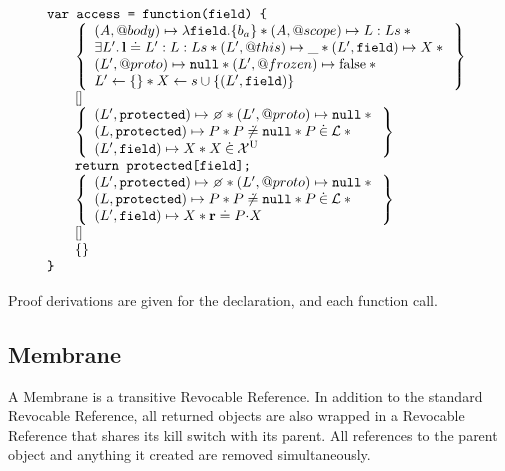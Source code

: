 \documentclass[a4paper]{article}
\begin{document}
\[
  \begin{array}{l}
    \js{var access = function(field) \{} \\
    \begin{array}{@{\qquad}l}
      \logic{
        (A, @body) \mapsto \lambda \js{field}.\{b_a\} \sep (A, @scope) \mapsto L:Ls \sep {} \\
        \exists L' \st \ls \doteq L' : L : Ls \sep (L',@this) \mapsto \_ \sep
        (L', \js{field}) \mapsto X \sep {} \\
        (L',@proto) \mapsto \nil \sep (L',@frozen) \mapsto \false \sep {} \\
        L' \bp \{\} \sep X \bp s \cup \{(L', \js{field})\}
      } \\
      \step{} \\
      \logic{
        (L',\js{protected}) \mapsto \none \sep (L',@proto) \mapsto \nil \sep {} \\
        (L, \js{protected}) \mapsto P \sep
        P \not\doteq \nil \sep P \dotin \loc \sep {} \\
        (L',\js{field}) \mapsto X \sep X \dotin \uvars
      } \\
      \js{return protected[field];} \\
      \logic{
        (L',\js{protected}) \mapsto \none \sep (L',@proto) \mapsto \nil \sep {} \\
        (L, \js{protected}) \mapsto P \sep
        P \not\doteq \nil \sep P \dotin \loc \sep {} \\
        (L',\js{field}) \mapsto X \sep \rv \doteq \fld{P}{X}
      } \\
      \step{} \\
      \logic{

      } \\
    \end{array} \\
    \js{\}}
  \end{array}
\]


Proof derivations are given for the declaration, and each function call.

\subsection{Membrane}
A Membrane is a transitive Revocable Reference. In addition to the standard
Revocable Reference, all returned objects are also wrapped in a Revocable
Reference that shares its kill switch with its parent. All references to the
parent object and anything it created are removed simultaneously.
\end{document}
